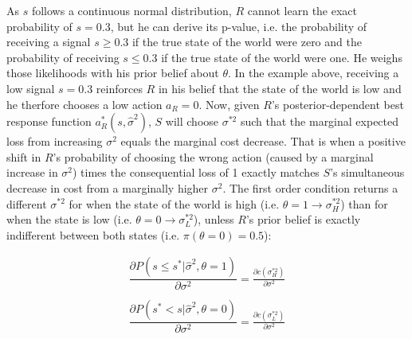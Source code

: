 \documentclass[paper=a4,12pt,DIV=11,twoside=false]{scrartcl}
\begin{document}
\noindent As $s$ follows a continuous normal distribution, $R$ cannot learn the exact probability of $s=0.3$, but he can derive its p-value, i.e. the probability of receiving a signal $s \geq 0.3$ if the true state of the world were zero and the probability of receiving  $s \leq 0.3$ if the true state of the world were one. He weighs those likelihoods with his prior belief about $\theta$. In the example above, receiving a low signal $s=0.3$ reinforces $R$ in his belief that the state of the world is low and he therfore chooses a low action $a_{R}=0$. Now, given $R$'s posterior-dependent best response function $a_{R}^{*}(s,\hat{\sigma}^2)$, $S$ will choose $\sigma^{*2}$ such that the marginal expected loss from increasing $\sigma^2$ equals the marginal cost decrease. That is when a positive shift in $R$'s probability of choosing the wrong action (caused by a marginal increase in $\sigma^2$) times the consequential loss of 1 exactly matches $S$'s simultaneous decrease in cost from a marginally higher $\sigma^2$. The first order condition returns a different $\sigma^{*2}$ for when the state of the world is high (i.e. $\theta = 1 \rightarrow \sigma^{*2}_H$) than for when the state is low (i.e. $\theta = 0 \rightarrow \sigma^{*2}_L$), unless $R$'s prior belief is exactly indifferent between both states (i.e. $\pi(\theta = 0)=0.5$):

\begin{equation}
\begin{array}{ll}
\dfrac{\partial P(s \leq s^{*}|\hat{\sigma}^2,\theta=1)}{\partial \sigma^{2}} = \frac{\partial c(\sigma^{*2}_H)}{\partial \sigma^{2}}\\
\\
\dfrac{\partial P(s^{*} < s|\hat{\sigma}^2,\theta=0)}{\partial \sigma^{2}} = \frac{\partial c(\sigma^{*2}_L)}{\partial \sigma^{2}}\\
\end{array} 
\end{equation}
\end{document}

